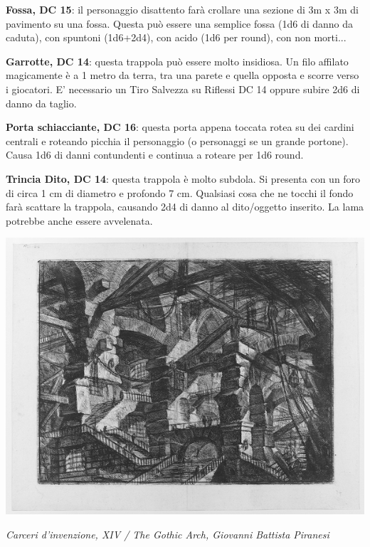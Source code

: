 \begin{multicols}{2}
\textbf{Fossa, DC 15}: il personaggio disattento farà crollare una sezione di 3m x 3m di pavimento su una fossa. Questa può essere una semplice fossa (1d6 di danno da caduta), con spuntoni (1d6+2d4), con acido (1d6 per round), con non morti...

\textbf{Garrotte, DC 14}: questa trappola può essere molto insidiosa. Un filo affilato magicamente è a 1 metro da terra, tra una parete e quella opposta e scorre verso i giocatori.
E' necessario un Tiro Salvezza su Riflessi DC 14 oppure subire 2d6 di danno da taglio.

\textbf{Porta schiacciante, DC 16}: questa porta appena toccata rotea su dei cardini centrali e roteando picchia il personaggio (o personaggi se un grande portone). Causa 1d6 di danni contundenti e continua a roteare per 1d6 round.

\textbf{Trincia Dito, DC 14}: questa trappola è molto subdola. Si presenta con un foro di circa 1 cm di diametro e profondo 7 cm. Qualsiasi cosa che ne tocchi il fondo farà scattare la trappola, causando 2d4 di danno al dito/oggetto inserito. La lama potrebbe anche essere avvelenata.

\end{multicols}

\vfill

\begin{center}
\includegraphics[width=0.35\linewidth]{immagini/GBP14.png}

\emph{Carceri d'invenzione, XIV / The Gothic Arch, Giovanni Battista Piranesi}
\end{center}

\pagebreak

